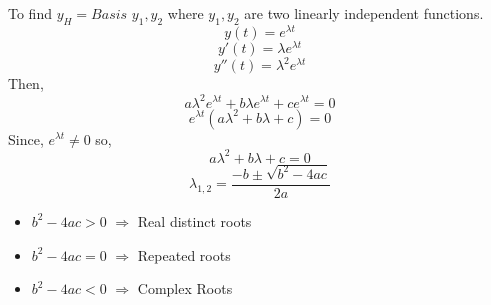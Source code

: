 \documentclass[
  11pt,
]{article}
\providecommand{\tightlist}{%
  \setlength{\itemsep}{0pt}\setlength{\parskip}{0pt}}
\begin{document}
To find \(y_H = Basis\) \({y_1, y_2}\) where \(y_1, y_2\) are two
linearly independent functions. \[y(t)=e^{\lambda t}\]
\[y'(t)=\lambda e^{\lambda t}\] \[y''(t)=\lambda^2 e^{\lambda t}\] Then,
\[a\lambda^2 e^{\lambda t} + b\lambda e^{\lambda t} + c e^{\lambda t} = 0\]
\[e^{\lambda t}(a\lambda^2 +b\lambda + c) = 0\] Since,
\(e^{\lambda t} \neq 0\) so, \[a\lambda^2 +b\lambda + c= 0\]
\[\lambda_{1,2} = \frac{-b\pm\sqrt{b^2-4ac}}{2a}\]

\begin{itemize}
\tightlist
\item
  \(b^2-4ac>0\) \(\Longrightarrow\) Real distinct roots
\item
  \(b^2-4ac=0\) \(\Longrightarrow\) Repeated roots
\item
  \(b^2-4ac<0\) \(\Longrightarrow\) Complex Roots
\end{itemize}
\end{document}
